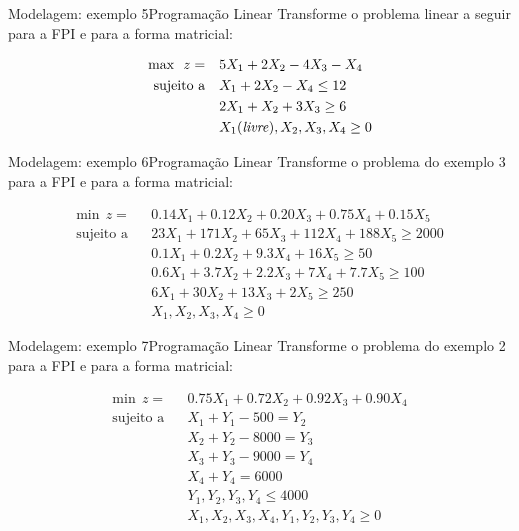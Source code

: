 \documentclass[t]{beamer}
\begin{document}

\begin{ftst}{Modelagem: exemplo 5}{Programação Linear}
Transforme o problema linear a seguir para a FPI e para a forma matricial:

\begin{align*}
        \text{max} \ \ z = \ \ \ & 5X_1 + 2X_2 - 4X_3 - X_4\\ 
        \text{sujeito a} \ \ \  & X_1 + 2X_2 - X_4 \leq 12 \\
        \text{} \ \ \ & 2X_1 + X_2 + 3X_3 \geq 6 \\
        \text{} \ \ \ & X_1 \text{(\textit{livre})}, X_2, X_3, X_4 \geq 0
\end{align*}


\end{ftst}


\begin{ftst}{Modelagem: exemplo 6}{Programação Linear}
Transforme o problema do exemplo 3 para a FPI e para a forma matricial:

\begin{align*}
        \text{min} \ \ z = \ \ \ & 0.14X_1 + 0.12X_2 + 0.20X_3 + 0.75X_4 + 0.15X_5\\ 
        \text{sujeito a} \ \ \  & 23X_1 + 171X_2 + 65X_3 + 112X_4 + 188X_5 \geq 2000 \\
                  \text{} \ \ \ & 0.1X_1 + 0.2X_2 + 9.3X_4 + 16X_5 \geq 50 \\
                  \text{} \ \ \ & 0.6X_1 + 3.7X_2 + 2.2X_3 + 7X_4 + 7.7X_5 \geq 100 \\
                  \text{} \ \ \ & 6X_1 + 30X_2 + 13X_3 + 2X_5 \geq 250 \\
                  \text{} \ \ \ & X_1, X_2, X_3, X_4 \geq 0
\end{align*}
\end{ftst}


\begin{ftst}{Modelagem: exemplo 7}{Programação Linear}
Transforme o problema do exemplo 2 para a FPI e para a forma matricial:

\begin{align*}
        \text{min} \ \ z = \ \ \ & 0.75X_1 + 0.72X_2 + 0.92X_3 + 0.90X_4 \\ 
        \text{sujeito a} \ \ \  & X_1 + Y_1 - 500 = Y_2 \\
                  \text{} \ \ \ & X_2 + Y_2 - 8000 = Y_3 \\
                  \text{} \ \ \ & X_3 + Y_3 - 9000 = Y_4 \\
                  \text{} \ \ \ & X_4 + Y_4 = 6000 \\
                  \text{} \ \ \ & Y_1, Y_2, Y_3, Y_4 \leq 4000 \\
                  \text{} \ \ \ & X_1, X_2, X_3, X_4, Y_1, Y_2, Y_3, Y_4 \geq 0
\end{align*}
\end{ftst}
\end{document}
